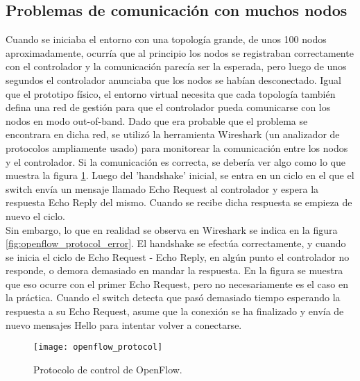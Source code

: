 \subsection{Problemas de comunicación con muchos nodos}
Cuando se iniciaba el entorno con una topología grande, de unos 100 nodos aproximadamente, ocurría que al principio los nodos se registraban correctamente con el controlador y la comunicación parecía ser la esperada, pero luego de unos segundos el controlador anunciaba que los nodos se habían desconectado.
Igual que el prototipo físico, el entorno virtual necesita que cada topología también defina una red de gestión para que el controlador pueda comunicarse con los nodos en modo out-of-band. Dado que era probable que el problema se encontrara en dicha red, se utilizó la herramienta Wireshark (un analizador de protocolos ampliamente usado) para monitorear la comunicación entre los nodos y el controlador. Si la comunicación es correcta, se debería ver algo como lo que muestra la figura \ref{fig:openflow_protocol}. Luego del 'handshake' inicial, se entra en un ciclo en el que el switch envía un mensaje llamado Echo Request al controlador y espera la respuesta Echo Reply del mismo. Cuando se recibe dicha respuesta se empieza de nuevo el ciclo. \\
Sin embargo, lo que en realidad se observa en Wireshark se indica en la figura \ref{fig:openflow_protocol_error}. El handshake se efectúa correctamente, y cuando se inicia el ciclo de Echo Request - Echo Reply, en algún punto el controlador no responde, o demora demasiado en mandar la respuesta. En la figura se muestra que eso ocurre con el primer Echo Request, pero no necesariamente es el caso en la práctica. Cuando el switch detecta que pasó demasiado tiempo esperando la respuesta a su Echo Request, asume que la conexión se ha finalizado y envía de nuevo mensajes Hello para intentar volver a conectarse. \\
\begin{figure}[t]
	\caption{Protocolo de control de OpenFlow.}
	\texttt{[image: openflow\_protocol]}
	\centering
	\label{fig:openflow_protocol}
\end{figure}

